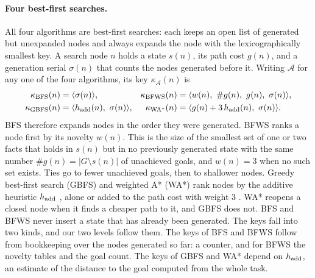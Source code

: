 \paragraph{Four best-first searches.} All four algorithms are best-first searches: each keeps an open list of generated but unexpanded nodes and always expands the node with the lexicographically smallest key. A search node $n$ holds a state $s(n)$, its path cost $g(n)$, and a generation serial $\sigma(n)$ that counts the nodes generated before it. Writing $\mathcal{A}$ for any one of the four algorithms, its key $\kappa_{\mathcal{A}}(n)$ is
\begin{equation}
\begin{aligned}
\kappa_{\rm BFS}(n) &= \langle \sigma(n) \rangle, &
\kappa_{\rm BFWS}(n) &= \langle w(n),\ \#g(n),\ g(n),\ \sigma(n) \rangle, \\
\kappa_{\rm GBFS}(n) &= \langle h_{\rm add}(n),\ \sigma(n) \rangle, &
\kappa_{\rm WA^*}(n) &= \langle g(n)+3\,h_{\rm add}(n),\ \sigma(n) \rangle.
\end{aligned}
\label{eq:keys}
\end{equation}
BFS therefore expands nodes in the order they were generated. BFWS \citep{lipovetzky2017bestfirst} ranks a node first by its novelty $w(n)$. This is the size of the smallest set of one or two facts that holds in $s(n)$ but in no previously generated state with the same number $\#g(n)=|G\setminus s(n)|$ of unachieved goals, and $w(n)=3$ when no such set exists. Ties go to fewer unachieved goals, then to shallower nodes. Greedy best-first search (GBFS) and weighted A* (WA*) rank nodes by the additive heuristic $h_{\rm add}$ \citep{bonet2001planning}, alone or added to the path cost with weight 3 \citep{hart1968formal,pohl1970heuristic}. WA* reopens a closed node when it finds a cheaper path to it, and GBFS does not. BFS and BFWS never insert a state that has already been generated. The keys fall into two kinds, and our two levels follow them. The keys of BFS and BFWS follow from bookkeeping over the nodes generated so far: a counter, and for BFWS the novelty tables and the goal count. The keys of GBFS and WA* depend on $h_{\rm add}$, an estimate of the distance to the goal computed from the whole task.
